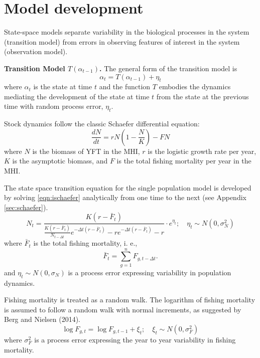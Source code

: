 \documentclass[12pt,letterpaper,twoside]{article}
\begin{document}
\clearpage

\appendix
\section{Model development}
\label{sec:models}
State-space models separate variability in the biological
processes in the system (transition model)
from errors in observing features of interest
in the system (observation model).

{\bf Transition Model $T(\alpha_{t-1})$.}
The general form of the transition model is
\begin{equation}
\alpha_t=T(\alpha_{t-1}) + \eta_t
\end{equation}
where $\alpha_t$ is the state at time $t$ and 
the function $T$ embodies the dynamics mediating the
development of the state at time $t$ from the state at the previous
time with random process error, $\eta_t$.

Stock dynamics follow the classic Schaefer differential equation:
\begin{equation}
\label{eqn:ischaefer}
\frac{dN}{dt} = rN(1-\frac{N}{K}) - FN
\end{equation}
where $N$ is the biomass of YFT in the MHI, 
$r$ is the logistic growth rate per year,
$K$ is the asymptotic biomass, and
$F$ is the total fishing mortality per year in the MHI.

The state space transition equation for the single population model is
developed by solving \ref{eqn:ischaefer} analytically from one time to
the next (see Appendix \ref{sec:schaefer}).
\begin{equation}
\label{eqn:intschaeferA}
N_t = \frac{K(r-\bar{F}_t)}{\frac{K(r-\bar{F}_t)}{N_{t-\Delta t}}e^{-\Delta
t(r-\bar{F}_t)}-re^{-\Delta t(r-\bar{F}_t)} -r} \cdot e^{\eta_t};
\quad \eta_t\sim N(0,\sigma^2_N)
\end{equation}
where 
$\bar{F}_t$ is the total fishing mortality, i. e.,
$$
\bar{F}_t =\sum_{g=1}^n F_{g,t-\Delta t}.
$$
and $\eta_t \sim N(0,\sigma_N)$ is a process error expressing
variability in population dynamics.

Fishing mortality is treated as a random walk.
The logarithm of fishing mortality is assumed to
follow a random walk with normal increments, as suggested by Berg and
Nielsen (2014).
\begin{equation}
\label{eqn:Fwalk}
\log F_{g,t} = \log F_{g,t-1} + \xi_t;\quad \xi_t\sim
N(0,\sigma^2_F)
\end{equation}
where  $\sigma^2_F$ is a process error expressing the year to year
variability in fishing mortality.
\end{document}
